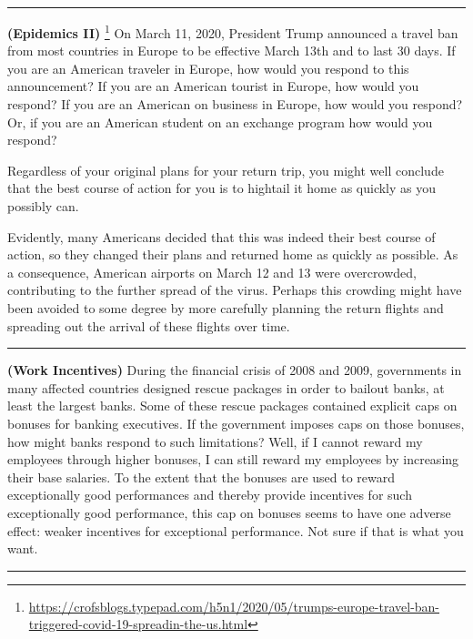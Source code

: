 \documentclass[
]{book}
\begin{document}
\begin{center}\rule{0.5\linewidth}{0.5pt}\end{center}

\textbf{(Epidemics II)} \footnote{\url{https://crofsblogs.typepad.com/h5n1/2020/05/trumps-europe-travel-ban-triggered-covid-19-spreadin-the-us.html}} On March 11, 2020, President Trump announced a travel ban from most countries in Europe to be effective March 13th and to last 30 days. If you are an American traveler in Europe, how would you respond to this announcement? If you are an American tourist in Europe, how would you respond? If you are an American on business in Europe, how would you respond? Or, if you are an American student on an exchange program how would you respond?

Regardless of your original plans for your return trip, you might well conclude that the best course of action for you is to hightail it home as quickly as you possibly can.

Evidently, many Americans decided that this was indeed their best course of action, so they changed their plans and returned home as quickly as possible. As a consequence, American airports on March 12 and 13 were overcrowded, contributing to the further spread of the virus. Perhaps this crowding might have been avoided to some degree by more carefully planning the return flights and spreading out the arrival of these flights over time.

\begin{center}\rule{0.5\linewidth}{0.5pt}\end{center}

\textbf{(Work Incentives)} During the financial crisis of 2008 and 2009, governments in many affected countries designed rescue packages in order to bailout banks, at least the largest banks. Some of these rescue packages contained explicit caps on bonuses for banking executives. If the government imposes caps on those bonuses, how might banks respond to such limitations? Well, if I cannot reward my employees through higher bonuses, I can still reward my employees by increasing their base salaries. To the extent that the bonuses are used to reward exceptionally good performances and thereby provide incentives for such exceptionally good performance, this cap on bonuses seems to have one adverse effect: weaker incentives for exceptional performance. Not sure if that is what you want.

\begin{center}\rule{0.5\linewidth}{0.5pt}\end{center}
\end{document}
